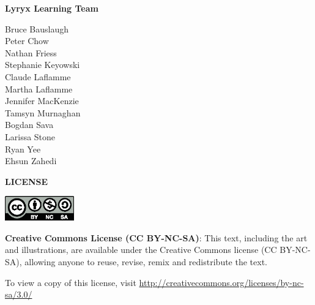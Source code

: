\vfill

{\small
\begin{center}
\textbf{Lyryx Learning Team}
\vspace{-1em}

\begin{multicols}{2}
Bruce Bauslaugh \\
Peter Chow \\
Nathan Friess \\
Stephanie Keyowski \\
Claude Laflamme \\
Martha Laflamme \\ 
Jennifer MacKenzie \\
Tamsyn Murnaghan \\
Bogdan Sava \\
Larissa Stone \\
Ryan Yee\\
Ehsun Zahedi\\
\end{multicols}
\end{center}

}

\vfill

\begin{center}
\fontsize{14pt}{16pt}\selectfont\textcolor{cctextcolour}{\textbf{LICENSE}}
\end{center}



\begin{center}

 \includegraphics[width=3cm]{images/by-nc-sa.eps}

\medskip


\textbf{Creative Commons License (CC BY-NC-SA)}: This text, including the art and illustrations, are available under the Creative Commons license (CC BY-NC-SA), allowing anyone to reuse, revise, remix and redistribute the text.  

\medskip

 To view a copy of this license,
visit \href{http://creativecommons.org/licenses/by-nc-sa/3.0/}{http://creativecommons.org/licenses/by-nc-sa/3.0/}  

\end{center}


\setlength{\parskip}{\baselineskip}
